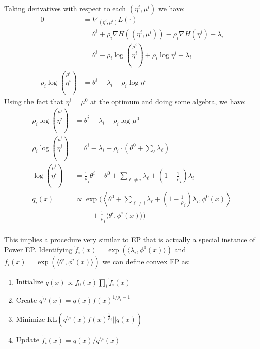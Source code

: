 \documentclass[times, 10pt,twocolumn]{article}
\newcommand{\bs}[0]{\textrm{\textbackslash}}
\begin{document}
Taking derivatives with respect to each $(\eta^i,\mu^i)$ we have:
\begin{equation*}
  \begin{split}
    0 &= \nabla_{(\eta^i,\mu^i)} L(\cdot) \\
    &= \theta^i + \rho_i \nabla H\left((\eta^i,\mu^i)\right) - \rho_i \nabla
    H(\eta^i) -\lambda_i \\
    &= \theta^i  - \rho_i \log \left (\stackrel{\mu^i}{\eta^i}\right) +
  \rho_i   \log \eta^i  - \lambda_i \\
   \rho_i   \log \left (\stackrel{\mu^i}{\eta^i}\right)&= \theta^i  -
    \lambda_i + \rho_i \log \eta^i
   \end{split}
 \end{equation*}
Using the fact that $\eta^i = \mu^0$ at the optimum and doing
some algebra, we have:
\begin{equation*}
  \begin{split}
    \rho_i \log \left (\stackrel{\mu^i}{\eta^i}\right)&= \theta^i  -
    \lambda_i + \rho_i \log \mu^0 \\
    \rho_i \log \left (\stackrel{\mu^i}{\eta^i}\right)&= \theta^i  -
    \lambda_i + \rho_i \cdot ( \theta^0  + \sum_\ell \lambda_\ell) \\
    \log \left (\stackrel{\mu^i}{\eta^i}\right)&=  \frac1\rho_i
    \theta^i  + \theta^0  + \sum_{\ell \ne i} \lambda_\ell  +
    (1-\frac 1\rho_i)\lambda_i\\
    q_i(x) & \propto \exp(\left \langle \theta^0  + \sum_{\ell \ne
    i}\lambda_\ell + (1-\frac 1\rho_i)\lambda_i , \phi^0(x)
    \right\rangle\\ &\phantom{\cdots\cdots\cdots} + \frac1\rho_i \langle \theta^i,\phi^i(x)
    \rangle )\\
   \end{split}
 \end{equation*}

This implies a procedure very similar to EP that is actually a
special instance of Power EP\cite{minka2004}.  Identifying $\tilde f_i(x) =
\exp(\langle\lambda_i,\phi^0(x)\rangle)$ and $f_i(x) =
\exp(\langle\theta^i,\phi^i(x)\rangle)$ we can define convex EP as:
\begin{enumerate}
  \item Initialize $q(x) \propto f_0(x) \prod_i \tilde f_i(x)$
  \item Create $q^{\bs i}(x) = q(x)f(x)^{1/\rho_i - 1}$
  \item Minimize $\mathrm{KL}\left (q^{\bs i}(x)f(x)^{\frac1\rho_i} || q(x)\right)$
  \item Update $\tilde f_i(x) = q(x)/q^{\bs i}(x)$
\end{enumerate}
\end{document}
